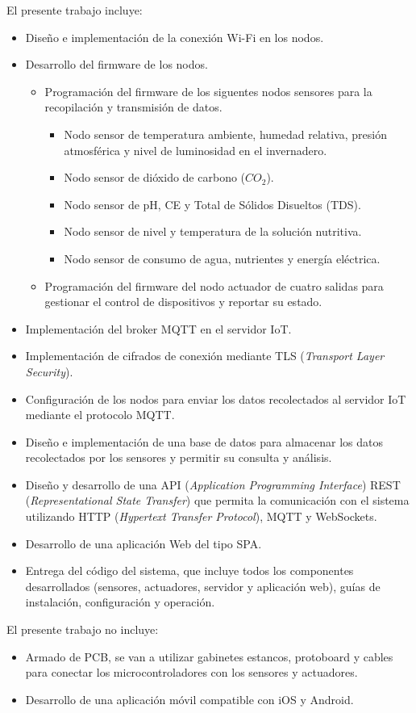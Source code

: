 El presente trabajo incluye:
\begin{itemize}
	\item Diseño e implementación de la conexión Wi-Fi en los nodos.
	\item Desarrollo del firmware de los nodos.
	      \begin{itemize}
		      \item Programación del firmware de los siguentes nodos sensores para la recopilación
		            y transmisión de datos.
		            \begin{itemize}
			            \item Nodo sensor de temperatura ambiente, humedad relativa, presión atmosférica y nivel de luminosidad en el invernadero.
			            \item Nodo sensor de dióxido de carbono ($CO_2$).
			            \item Nodo sensor de pH, CE y Total de Sólidos Disueltos (TDS).
			            \item Nodo sensor de nivel y temperatura de la solución nutritiva.
			            \item Nodo sensor de consumo de agua, nutrientes y energía eléctrica.
		            \end{itemize}
		      \item Programación del firmware del nodo actuador de cuatro salidas para gestionar el
		            control de dispositivos y reportar su estado.
	      \end{itemize}
	\item Implementación del broker MQTT en el servidor IoT.
	\item Implementación de cifrados de conexión mediante TLS (\textit{Transport Layer Security}).
	\item Configuración de los nodos para enviar los datos recolectados al servidor IoT mediante el protocolo MQTT.
	\item Diseño e implementación de una base de datos para almacenar los datos recolectados por los sensores y permitir su consulta y análisis.
	\item Diseño y desarrollo de una API (\textit{Application Programming Interface}) REST (\textit{Representational State Transfer}) que permita 
		  la comunicación con el sistema utilizando HTTP (\textit{Hypertext Transfer Protocol}), MQTT y WebSockets.
	\item Desarrollo de una aplicación Web del tipo SPA.
	\item Entrega del código del sistema, que incluye todos los componentes desarrollados (sensores, actuadores, servidor y aplicación web), guías de instalación,
	      configuración y operación.
\end{itemize}

El presente trabajo no incluye:
\begin{itemize}
	\item Armado de PCB, se van a utilizar gabinetes estancos, protoboard y cables para conectar los microcontroladores con los sensores y actuadores.
	\item Desarrollo de una aplicación móvil compatible con iOS y Android.
\end{itemize}